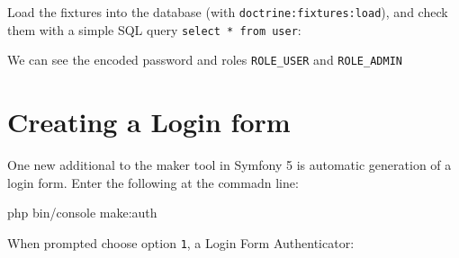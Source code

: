 \documentclass[a4paperpaper,openright]{book}
\newenvironment{Shaded}{}{}
\newcommand{\ExtensionTok}[1]{#1}
\newcommand{\NormalTok}[1]{#1}
\newcommand{\OperatorTok}[1]{\textcolor[rgb]{0.40,0.40,0.40}{#1}}
\newcommand{\StringTok}[1]{\textcolor[rgb]{0.25,0.44,0.63}{#1}}
\begin{document}
Load the fixtures into the database (with
\texttt{doctrine:fixtures:load}), and check them with a simple SQL query
\texttt{select\ *\ from\ user}:

\begin{Shaded}
\end{Shaded}

We can see the encoded password and roles \texttt{ROLE\_USER} and
\texttt{ROLE\_ADMIN}

\hypertarget{creating-a-login-form}{%
\section{Creating a Login form}\label{creating-a-login-form}}

One new additional to the maker tool in Symfony 5 is automatic
generation of a login form. Enter the following at the commadn line:

\begin{Shaded}
\begin{Highlighting}[]
    \ExtensionTok{php}\NormalTok{ bin/console make:auth}
\end{Highlighting}
\end{Shaded}

When prompted choose option \texttt{1}, a Login Form Authenticator:
\end{document}
